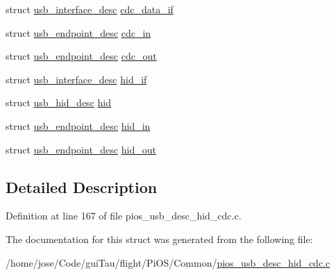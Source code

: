 \begin{DoxyCompactItemize}
struct \hyperlink{structusb__interface__desc}{usb\-\_\-interface\-\_\-desc} \hyperlink{group___p_i_o_s___u_s_b___d_e_s_c_ga80b1d19d38b5379618c5e66f0da9dcb2}{cdc\-\_\-data\-\_\-if}
\item 
struct \hyperlink{structusb__endpoint__desc}{usb\-\_\-endpoint\-\_\-desc} \hyperlink{group___p_i_o_s___u_s_b___d_e_s_c_ga599b79ff75341552732decb7763cc6c8}{cdc\-\_\-in}
\item 
struct \hyperlink{structusb__endpoint__desc}{usb\-\_\-endpoint\-\_\-desc} \hyperlink{group___p_i_o_s___u_s_b___d_e_s_c_ga38856efc6dd6e0466e9bfb7533992dc3}{cdc\-\_\-out}
\item 
struct \hyperlink{structusb__interface__desc}{usb\-\_\-interface\-\_\-desc} \hyperlink{group___p_i_o_s___u_s_b___d_e_s_c_gadeb93743c31b647e20653e4423233982}{hid\-\_\-if}
\item 
struct \hyperlink{structusb__hid__desc}{usb\-\_\-hid\-\_\-desc} \hyperlink{group___p_i_o_s___u_s_b___d_e_s_c_ga8b4c52ed5995d3193869596bc47a4e58}{hid}
\item 
struct \hyperlink{structusb__endpoint__desc}{usb\-\_\-endpoint\-\_\-desc} \hyperlink{group___p_i_o_s___u_s_b___d_e_s_c_gaf6d4567d3dfbf3397c5842bdef4e13c8}{hid\-\_\-in}
\item 
struct \hyperlink{structusb__endpoint__desc}{usb\-\_\-endpoint\-\_\-desc} \hyperlink{group___p_i_o_s___u_s_b___d_e_s_c_gad76c86a5c7e42e823404bf0e7ddff4f2}{hid\-\_\-out}
\end{DoxyCompactItemize}


\subsection{Detailed Description}


Definition at line 167 of file pios\-\_\-usb\-\_\-desc\-\_\-hid\-\_\-cdc.\-c.



The documentation for this struct was generated from the following file\-:\begin{DoxyCompactItemize}
\item 
/home/jose/\-Code/gui\-Tau/flight/\-Pi\-O\-S/\-Common/\hyperlink{pios__usb__desc__hid__cdc_8c}{pios\-\_\-usb\-\_\-desc\-\_\-hid\-\_\-cdc.\-c}\end{DoxyCompactItemize}
